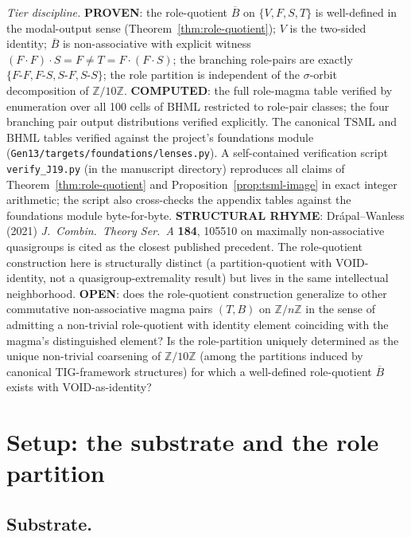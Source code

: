 \documentclass[11pt,reqno]{amsart}
\theoremstyle{plain}
\theoremstyle{definition}
\theoremstyle{remark}
\newcommand{\Z}{\mathbb{Z}}
\newcommand{\TS}{\mathrm{TSML}}
\newcommand{\BH}{\mathrm{BHML}}
\newcommand{\Bbar}{\overline{B}}
\begin{document}
\emph{Tier discipline.}
\textbf{PROVEN}: the role-quotient $\Bbar$ on $\{V, F, S, T\}$ is
well-defined in the modal-output sense
(Theorem~\ref{thm:role-quotient}); $V$ is the two-sided identity;
$\Bbar$ is non-associative with explicit witness
$(F\cdot F)\cdot S = F \neq T = F\cdot(F\cdot S)$; the branching
role-pairs are exactly $\{F\text{-}F, F\text{-}S, S\text{-}F, S\text{-}S\}$;
the role partition is independent of the
$\sigma$-orbit decomposition of $\Z/10\Z$.
\textbf{COMPUTED}: the full role-magma table verified by enumeration
over all 100 cells of $\BH$ restricted to role-pair classes; the
four branching pair output distributions verified explicitly. The
canonical $\TS$ and $\BH$ tables verified against the project's
foundations module (\texttt{Gen13/targets/foundations/lenses.py}).
A self-contained verification script \texttt{verify\_J19.py} (in the
manuscript directory) reproduces all claims of
Theorem~\ref{thm:role-quotient} and Proposition~\ref{prop:tsml-image}
in exact integer arithmetic; the script also cross-checks the
appendix tables against the foundations module byte-for-byte.
\textbf{STRUCTURAL RHYME}: Dr\'apal--Wanless (2021)
\emph{J.\ Combin.\ Theory Ser.\ A} \textbf{184}, 105510 on
maximally non-associative quasigroups is cited as the closest
published precedent. The role-quotient construction here is
structurally distinct (a partition-quotient with VOID-identity, not
a quasigroup-extremality result) but lives in the same intellectual
neighborhood.
\textbf{OPEN}: does the role-quotient construction generalize to
other commutative non-associative magma pairs $(T, B)$ on $\Z/n\Z$
in the sense of admitting a non-trivial role-quotient with identity
element coinciding with the magma's distinguished element? Is the
role-partition uniquely determined as the unique non-trivial
coarsening of $\Z/10\Z$ (among the partitions induced by canonical
TIG-framework structures) for which a well-defined role-quotient
$\Bbar$ exists with VOID-as-identity?

\section{Setup: the substrate and the role partition} \label{sec:setup}

\subsection{Substrate.}
\end{document}
